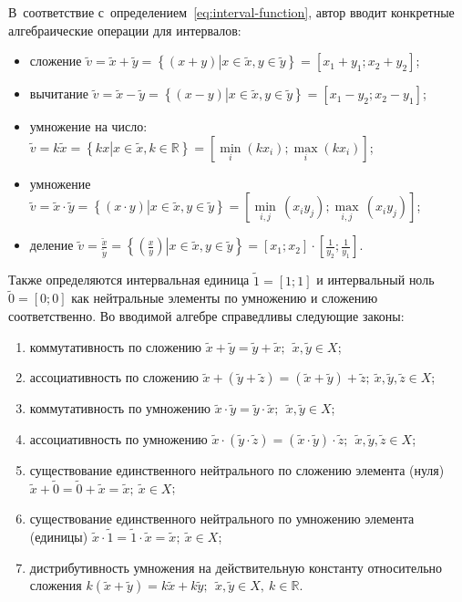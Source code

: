 В~соответствие с~определением~\eqref{eq:interval-function}, автор вводит конкретные алгебраические операции для интервалов:
\begin{itemize}
	\item сложение $\tilde{v}=\tilde{x}+\tilde{y}=\left\{ \left( x+y \right)\left| x\in \tilde{x},y\in \tilde{y} \right. \right\}=\left[ {{x}_{1}}+{{y}_{1}};{{x}_{2}}+{{y}_{2}} \right]$;
	\item вычитание $\tilde{v}=\tilde{x}-\tilde{y}=\left\{ \left( x-y \right)\left| x\in \tilde{x},y\in \tilde{y} \right. \right\}=\left[ {{x}_{1}}-{{y}_{2}};{{x}_{2}}-{{y}_{1}} \right]$;
	\item умножение на число: $\tilde{v}=k\tilde{x}=\left\{ kx\left| x\in \tilde{x},k\in \mathbb{R} \right. \right\}=\left[\underset{i}{\mathop {\min}} \left( kx_i \right); \underset{i}{\mathop {\max}} \left( kx_i \right) \right]$;	
	\item умножение $\tilde{v}=\tilde{x}\cdot \tilde{y}=\left\{ \left( x\cdot y \right)\left| x\in \tilde{x},y\in \tilde{y} \right. \right\}=\left[ \underset{i,j}{\mathop{\min }}\,\left( {{x}_{i}}{{y}_{j}} \right);\underset{i,j}{\mathop{\max }}\,\left( {{x}_{i}}{{y}_{j}} \right) \right]$;
	\item деление $\displaystyle \tilde{v}=\frac{\tilde x}{\tilde y}=\left\{ \left. \left( \frac{x}{y} \right) \right|x\in \tilde{x},y\in \tilde{y} \right\}=\left[ {{x}_{1}};{{x}_{2}} \right]\cdot \left[ \frac{1}{{{y}_{2}}};\frac{1}{{{y}_{1}}} \right]$.
\end{itemize}

Также определяются интервальная единица $\tilde{1}=\left[ 1;1 \right]$ и интервальный ноль $\tilde{0}=\left[ 0;0 \right]$ как нейтральные элементы по умножению и сложению соответственно. Во вводимой алгебре справедливы следующие законы:
\begin{enumerate}
	\item коммутативность по сложению $\tilde{x}+\tilde{y}=\tilde{y}+\tilde{x};\ \ \tilde{x},\tilde{y}\in X$;
	\item ассоциативность по сложению $\tilde{x}+\left( \tilde{y}+\tilde{z} \right)=\left( \tilde{x}+\tilde{y} \right)+\tilde{z};\ \tilde{x},\tilde{y},\tilde{z}\in X$;
	\item коммутативность по умножению $\tilde{x}\cdot \tilde{y}=\tilde{y}\cdot \tilde{x};\ \ \tilde{x},\tilde{y}\in X$;
	\item ассоциативность по умножению $\tilde{x}\cdot \left( \tilde{y}\cdot \tilde{z} \right)=\left( \tilde{x}\cdot \tilde{y} \right)\cdot \tilde{z};\ \ \tilde{x},\tilde{y},\tilde{z}\in X$;
	\item существование единственного нейтрального по сложению элемента (нуля) $\tilde{x}+\tilde{0}=\tilde{0}+\tilde{x}=\tilde{x};\ \tilde{x}\in X$;
	\item существование единственного нейтрального по умножению элемента (единицы) $\tilde{x}\cdot \tilde{1}=\tilde{1}\cdot \tilde{x}=\tilde{x};\ \tilde{x}\in X$;
	\item дистрибутивность умножения на действительную константу относительно сложения $k\left( \tilde{x}+\tilde{y} \right)=k\tilde{x}+k\tilde{y};\ \ \tilde{x},\tilde{y}\in X,\ k\in \mathbb{R}$.
\end{enumerate}


